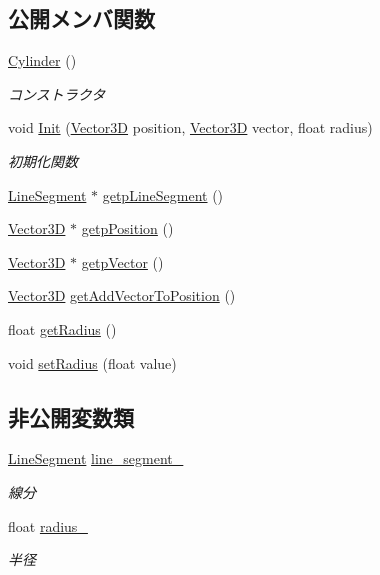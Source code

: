 \subsection*{公開メンバ関数}
\begin{DoxyCompactItemize}
\item 
\mbox{\hyperlink{class_cylinder_a01dc978cb576f834b9545e43d4dad2a2}{Cylinder}} ()
\begin{DoxyCompactList}\small\item\em コンストラクタ \end{DoxyCompactList}\item 
void \mbox{\hyperlink{class_cylinder_ab7d8167ece18b76e324a06482d22dacb}{Init}} (\mbox{\hyperlink{class_vector3_d}{Vector3D}} position, \mbox{\hyperlink{class_vector3_d}{Vector3D}} vector, float radius)
\begin{DoxyCompactList}\small\item\em 初期化関数 \end{DoxyCompactList}\item 
\mbox{\hyperlink{class_line_segment}{Line\+Segment}} $\ast$ \mbox{\hyperlink{class_cylinder_acc2a2c2a32575bb93ebfa9a21bb43fb8}{getp\+Line\+Segment}} ()
\item 
\mbox{\hyperlink{class_vector3_d}{Vector3D}} $\ast$ \mbox{\hyperlink{class_cylinder_a18c61448fbb080c79ab6b1a431803dea}{getp\+Position}} ()
\item 
\mbox{\hyperlink{class_vector3_d}{Vector3D}} $\ast$ \mbox{\hyperlink{class_cylinder_a7b1cd37bc88e50d81b4de4a34e0dafb0}{getp\+Vector}} ()
\item 
\mbox{\hyperlink{class_vector3_d}{Vector3D}} \mbox{\hyperlink{class_cylinder_af36a39d5a18d1a837d9880a00447d87b}{get\+Add\+Vector\+To\+Position}} ()
\item 
float \mbox{\hyperlink{class_cylinder_a54bd26ac60e885bdca9a101fcc998711}{get\+Radius}} ()
\item 
void \mbox{\hyperlink{class_cylinder_a3baa0a5587c54b7a92f170ce52d0f658}{set\+Radius}} (float value)
\end{DoxyCompactItemize}
\subsection*{非公開変数類}
\begin{DoxyCompactItemize}
\item 
\mbox{\hyperlink{class_line_segment}{Line\+Segment}} \mbox{\hyperlink{class_cylinder_a29d1c6c61863d19f617287da9474f1c4}{line\+\_\+segment\+\_\+}}
\begin{DoxyCompactList}\small\item\em 線分 \end{DoxyCompactList}\item 
float \mbox{\hyperlink{class_cylinder_abba752e07b11b7bfd8fcce64a6d9b678}{radius\+\_\+}}
\begin{DoxyCompactList}\small\item\em 半径 \end{DoxyCompactList}\end{DoxyCompactItemize}
